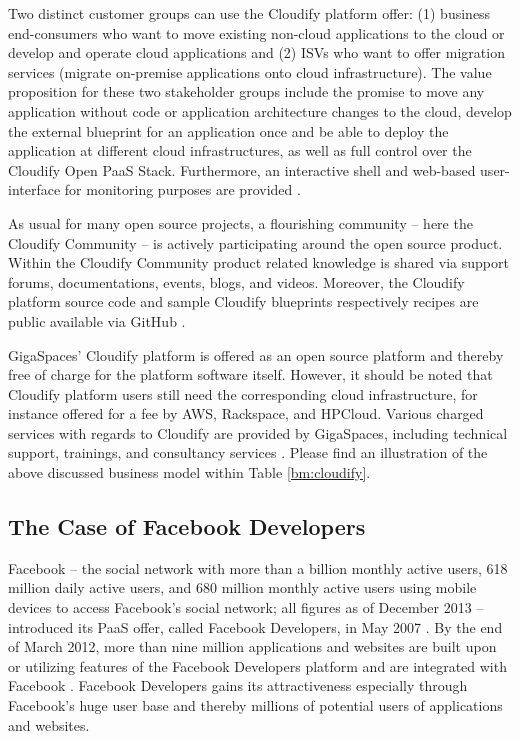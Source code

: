 Two distinct customer groups can use the Cloudify platform offer: (1) business end-consumers who want to move existing non-cloud applications to the cloud or develop and operate cloud applications and (2) \acp{ISV} who want to offer migration services (migrate on-premise applications onto cloud infrastructure). The value proposition for these two stakeholder groups include the promise to move any application without code or application architecture changes to the cloud, develop the external blueprint for an application once and be able to deploy the application at different cloud infrastructures, as well as full control over the Cloudify Open \ac{PaaS} Stack. Furthermore, an interactive shell and web-based user-interface for monitoring purposes are provided \citep{GigaSpaces2013a}.

As usual for many open source projects, a flourishing community -- here the Cloudify Community -- is actively participating around the open source product. Within the Cloudify Community product related knowledge is shared via support forums, documentations, events, blogs, and videos. Moreover, the Cloudify platform source code and sample Cloudify blueprints respectively recipes are public available via GitHub \citep{GigaSpaces2013b,GitHub2013,GitHub2013a}.

GigaSpaces' Cloudify platform is offered as an open source platform and thereby free of charge for the platform software itself. However, it should be noted that Cloudify platform users still need the corresponding cloud infrastructure, for instance offered for a fee by \ac{AWS}, Rackspace, and HPCloud. Various charged services with regards to Cloudify are provided by GigaSpaces, including technical support, trainings, and consultancy services \citep{GigaSpaces2013a}. Please find an illustration of the above discussed business model within Table \ref{bm:cloudify}.



\subsection{The Case of Facebook Developers}\label{ch:sota:fd}

Facebook -- the social network with more than a billion monthly active users, 618 million daily active users, and 680 million monthly active users using mobile devices to access Facebook's social network; all figures as of December 2013 -- introduced its \ac{PaaS} offer, called Facebook Developers, in May 2007 \citep{Facebook2013}. By the end of March 2012, more than nine million applications and websites are built upon or utilizing features of the Facebook Developers platform and are integrated with Facebook \citep{Facebook2013}. Facebook Developers gains its attractiveness especially through Facebook's huge user base and thereby millions of potential users of applications and websites.

